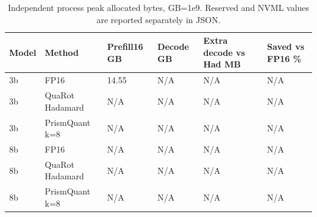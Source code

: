 \begin{table}[t]
\centering
\small
\caption{Independent process peak allocated bytes, GB=1e9. Reserved and NVML values are reported separately in JSON.}
\begin{tabular}{llllll}
\toprule
Model & Method & Prefill16 GB & Decode GB & Extra decode vs Had MB & Saved vs FP16 \% \\
\midrule
3b & FP16 & 14.55 & N/A & N/A & N/A \\
3b & QuaRot Hadamard & N/A & N/A & N/A & N/A \\
3b & PrismQuant k=8 & N/A & N/A & N/A & N/A \\
8b & FP16 & N/A & N/A & N/A & N/A \\
8b & QuaRot Hadamard & N/A & N/A & N/A & N/A \\
8b & PrismQuant k=8 & N/A & N/A & N/A & N/A \\
\bottomrule
\end{tabular}
\end{table}
